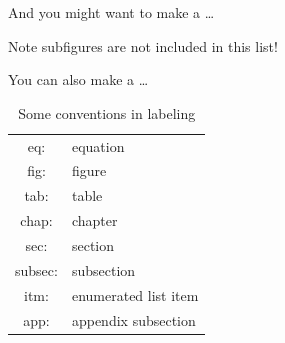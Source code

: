 \documentclass[thesis]{subfiles}
\begin{document}
And you might want to make a \dots 
\listoffigures
Note subfigures are not included in this list!

You can also make a \dots  
\listoftables

\begin{table}[b] %
	\centering
	\begin{tabular}{c|l}
		eq:&	equation \\ 
		fig:&	figure \\
		tab:&	table \\
		chap: &	chapter \\
		sec:&	section \\
		subsec:&	subsection \\
		itm:&	enumerated list item \\
		app:&	appendix subsection
	\end{tabular}
	\caption{Some conventions in labeling}
	\label{tab:conventions}
\end{table}
\end{document}
